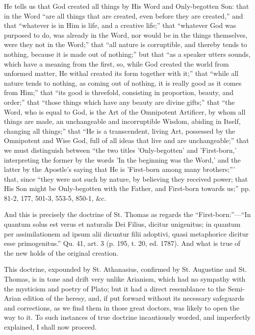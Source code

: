 He tells us that God created all things by His Word and
Only-begotten Son: that in the Word ``are all things that are
created, even before they are created,'' and that ``whatever
is in Him is life, and a creative life;'' that ``whatever God
was purposed to do, was already in the Word, nor would be in the
things themselves, were they not in the Word;'' that ``all
nature is corruptible, and thereby tends to nothing, because it is
made out of nothing;'' but that ``as a speaker utters sounds,
which have a meaning from the first, so, while God created the world
from unformed matter, He withal created its form together with
it;'' that ``while all nature tends to nothing, as coming out
of nothing, it is really good as it comes from Him;'' that
``its good is threefold, consisting in proportion, beauty, and
order;'' that ``those things which have any beauty are divine
gifts;'' that ``the Word, who is equal to God, is the Art of
the Omnipotent Artificer, by whom all things are made, an unchangeable
and incorruptible Wisdom, abiding in Itself, changing all
things;'' that ``He is a transcendent, living Art, possessed
by the Omnipotent and Wise God, full of all ideas that live and are
unchangeable;'' that we must distinguish between ``the
two titles 'Only-begotten' and 'First-born,' interpreting the former
by the words 'In the beginning was the Word,' and the latter by the
Apostle's saying that He is 'First-born among many brothers;'''
that, since ``they were not such by nature, by believing they
received power; that His Son might be Only-begotten with the Father,
and First-born towards us;'' pp. 81-2, 177, 501-3, 553-5, 850-1,
\&c.

And this is precisely the doctrine of St. Thomas as regards the
``First-born:''—``In quantum solus est verus et
naturalis Dei Filius, dicitur unigenitus; in quantum per
assimilationem ad ipsum alii dicuntur filii adoptivi, quasi
metaphorice dicitur esse primogenitus.'' Qu. 41, art. 3 (p. 195,
t. 20, ed. 1787). And what is true of the new holds of the original
creation.

This doctrine, expounded by St. Athanasius, confirmed by St.
Augustine and St. Thomas, is in tone and drift very unlike Arianism,
which had no sympathy with the mysticism and poetry of Plato; but it
had a direct resemblance to the Semi-Arian edition of the heresy, and,
if put forward without its necessary safeguards and corrections, as we
find them in those great doctors, was likely to open the way to it. To
such instances of true doctrine incautiously worded, and imperfectly
explained, I shall now proceed.

